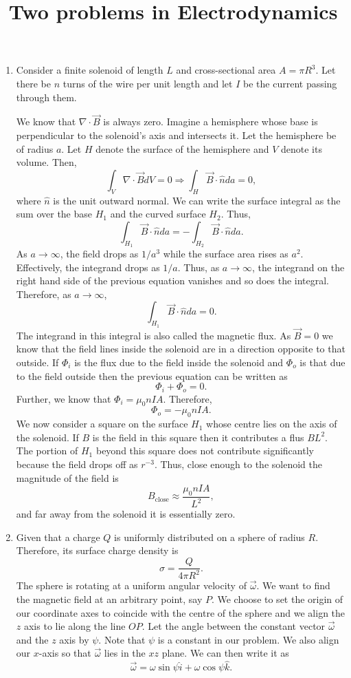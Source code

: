 \documentclass{article}
\title{Two problems in Electrodynamics}
\begin{document}
\begin{enumerate}
\item Consider a finite solenoid of length $L$ and cross-sectional area 
$A = \pi R^3$. Let there be $n$ turns of the wire per unit length and 
let $I$ be the current passing through them.

We know that $\nabla\cdot\vec{B}$ is always zero. Imagine a hemisphere whose
base is perpendicular to the solenoid's axis and intersects it. Let the
hemisphere be of radius $a$. Let $H$ denote the surface of the hemisphere
and $V$ denote its volume. Then,
\[
\int_V \nabla\cdot\vec{B}dV = 0 \Rightarrow \int_H \vec{B}\cdot\hat{n}da = 0,
\]
where $\hat{n}$ is the unit outward normal. We can write the surface integral 
as the sum over the base $H_1$ and the curved surface $H_2$. Thus,
\[
\int_{H_1}\vec{B}\cdot\hat{n}da = -\int_{H_2}\vec{B}\cdot\hat{n}da.
\]
As $a \rightarrow \infty$, the field drops as $1/a^3$ while the surface area
rises as $a^2$. Effectively, the integrand drops as $1/a$. Thus, as $a 
\rightarrow \infty$, the integrand on the right hand side of the previous
equation vanishes and so does the integral. Therefore, as $a \rightarrow 
\infty$,
\[
\int_{H_1}\vec{B}\cdot\hat{n}da = 0.
\]
The integrand in this integral is also called the magnetic flux. As $\vec{B}
= 0$ we know that the field lines inside the solenoid are in a direction
opposite to that outside. If $\Phi_i$ is the flux due to the field inside the
solenoid and $\Phi_o$ is that due to the field outside then the previous
equation can be written as 
\[
\Phi_i + \Phi_o = 0.
\]
Further, we know that $\Phi_i = \mu_0 nIA$. Therefore,
\[
\Phi_o = -\mu_0 nIA.
\]
We now consider a square on the surface $H_1$ whose centre lies on the 
axis of the solenoid. If $B$ is the field in this square then it contributes
a flus $BL^2$. The portion of $H_1$ beyond this square does not contribute
significantly because the field drops off as $r^{-3}$. Thus, close enough
to the solenoid the magnitude of the field is
\[
B_{\text{close}} \approx \frac{\mu_0 nIA}{L^2},
\]
and far away from the solenoid it is essentially zero.

\item Given that a charge $Q$ is uniformly distributed on a sphere of radius
$R$. Therefore, its surface charge density is
\begin{equation}\label{p2e1}
\sigma = \frac{Q}{4\pi R^2}.
\end{equation}
The sphere is rotating at a uniform angular velocity of $\vec{\omega}$. We want
to find the magnetic field at an arbitrary point, say $P$. We choose to set
the origin of our coordinate axes to coincide with the centre of the sphere and
we align the $z$ axis to lie along the line $OP$. Let the angle between the
constant vector $\vec{\omega}$ and the $z$ axis by $\psi$. Note that $\psi$
is a constant in our problem. We also align our $x$-axis so that $\vec{\omega}$
lies in the $xz$ plane. We can then write it as
\begin{equation}\label{p2e2}
\vec{\omega} = \omega\sin\psi\hat{i} + \omega\cos\psi\hat{k}.
\end{equation}


\end{enumerate}
\end{document}
